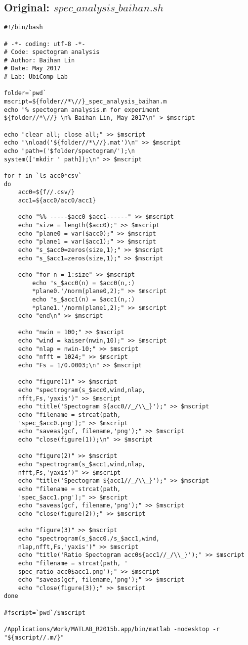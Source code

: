 \documentclass{sigchi}
\begin{document}
\subsection{Original: $spec\_analysis\_baihan.sh$}\label{ss:spc_ana.sh}
\begin{lstlisting}
#!/bin/bash

# -*- coding: utf-8 -*-
# Code: spectogram analysis
# Author: Baihan Lin
# Date: May 2017
# Lab: UbiComp Lab

folder=`pwd`
mscript=${folder//*\//}_spec_analysis_baihan.m
echo "% spectogram analysis.m for experiment 
${folder//*\//} \n% Baihan Lin, May 2017\n" > $mscript

echo "clear all; close all;" >> $mscript
echo "\nload('${folder//*\//}.mat')\n" >> $mscript
echo "path=('$folder/spectogram/');\n
system(['mkdir ' path]);\n" >> $mscript

for f in `ls acc0*csv`
do
    acc0=${f//.csv/}
    acc1=${acc0/acc0/acc1}

	echo "%% -----$acc0 $acc1------" >> $mscript
	echo "size = length($acc0);" >> $mscript
	echo "plane0 = var($acc0);" >> $mscript
	echo "plane1 = var($acc1);" >> $mscript
	echo "s_$acc0=zeros(size,1);" >> $mscript
	echo "s_$acc1=zeros(size,1);" >> $mscript
	
	echo "for n = 1:size" >> $mscript
    	echo "s_$acc0(n) = $acc0(n,:)
        *plane0.'/norm(plane0,2);" >> $mscript
    	echo "s_$acc1(n) = $acc1(n,:)
        *plane1.'/norm(plane1,2);" >> $mscript
	echo "end\n" >> $mscript

	echo "nwin = 100;" >> $mscript
	echo "wind = kaiser(nwin,10);" >> $mscript
	echo "nlap = nwin-10;" >> $mscript
	echo "nfft = 1024;" >> $mscript
	echo "Fs = 1/0.0003;\n" >> $mscript

	echo "figure(1)" >> $mscript
	echo "spectrogram(s_$acc0,wind,nlap,
    nfft,Fs,'yaxis')" >> $mscript
	echo "title('Spectogram ${acc0//_/\\_}');" >> $mscript
	echo "filename = strcat(path, 
    'spec_$acc0.png');" >> $mscript
	echo "saveas(gcf, filename,'png');" >> $mscript
	echo "close(figure(1));\n" >> $mscript

	echo "figure(2)" >> $mscript
	echo "spectrogram(s_$acc1,wind,nlap,
    nfft,Fs,'yaxis')" >> $mscript
	echo "title('Spectogram ${acc1//_/\\_}');" >> $mscript
	echo "filename = strcat(path, 
    'spec_$acc1.png');" >> $mscript
	echo "saveas(gcf, filename,'png');" >> $mscript
	echo "close(figure(2));" >> $mscript

	echo "figure(3)" >> $mscript
	echo "spectrogram(s_$acc0./s_$acc1,wind,
    nlap,nfft,Fs,'yaxis')" >> $mscript
	echo "title('Ratio Spectogram acc0${acc1//_/\\_}');" >> $mscript
	echo "filename = strcat(path, '
    spec_ratio_acc0$acc1.png');" >> $mscript
	echo "saveas(gcf, filename,'png');" >> $mscript
	echo "close(figure(3));" >> $mscript
done

#fscript=`pwd`/$mscript

/Applications/Work/MATLAB_R2015b.app/bin/matlab -nodesktop -r "${mscript//.m/}"

\end{lstlisting}
\end{document}
